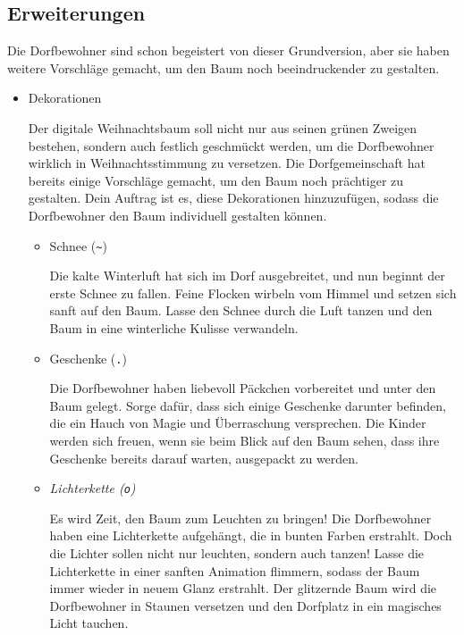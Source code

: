 \documentclass[12pt,a4paper]{article}
\begin{document}
\bigskip

\subsection{Erweiterungen}
Die Dorfbewohner sind schon begeistert von dieser Grundversion, aber sie haben weitere Vorschläge gemacht, um den Baum noch beeindruckender zu gestalten.

\begin{itemize}
    \item Dekorationen\par
    Der digitale Weihnachtsbaum soll nicht nur aus seinen grünen Zweigen bestehen, sondern auch festlich geschmückt werden, um die Dorfbewohner wirklich in Weihnachtsstimmung zu versetzen. Die Dorfgemeinschaft hat bereits einige Vorschläge gemacht, um den Baum noch prächtiger zu gestalten. Dein Auftrag ist es, diese Dekorationen hinzuzufügen, sodass die Dorfbewohner den Baum individuell gestalten können.
    \begin{itemize}
        \item Schnee (\texttt{\textasciitilde})\par
        Die kalte Winterluft hat sich im Dorf ausgebreitet, und nun beginnt der erste Schnee zu fallen. Feine Flocken wirbeln vom Himmel und setzen sich sanft auf den Baum. Lasse den Schnee durch die Luft tanzen und den Baum in eine winterliche Kulisse verwandeln.
        \item Geschenke (\texttt{.})\par
        Die Dorfbewohner haben liebevoll Päckchen vorbereitet und unter den Baum gelegt. Sorge dafür, dass sich einige Geschenke darunter befinden, die ein Hauch von Magie und Überraschung versprechen. Die Kinder werden sich freuen, wenn sie beim Blick auf den Baum sehen, dass ihre Geschenke bereits darauf warten, ausgepackt zu werden.
        \item \textit{Lichterkette (\texttt{o})}\par
        Es wird Zeit, den Baum zum Leuchten zu bringen! Die Dorfbewohner haben eine Lichterkette aufgehängt, die in bunten Farben erstrahlt. Doch die Lichter sollen nicht nur leuchten, sondern auch tanzen! Lasse die Lichterkette in einer sanften Animation flimmern, sodass der Baum immer wieder in neuem Glanz erstrahlt. Der glitzernde Baum wird die Dorfbewohner in Staunen versetzen und den Dorfplatz in ein magisches Licht tauchen.
        \begin{center}
        \begin{tcolorbox}[frame empty,nobeforeafter,colback=gray!5]

\end{tcolorbox}
\end{center}
\end{itemize}
\end{itemize}
\end{document}
